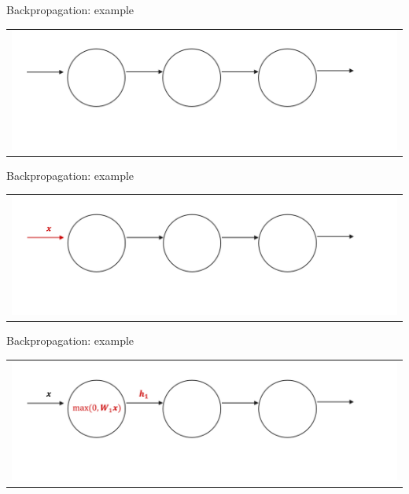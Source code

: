 \documentclass[aspectratio=169]{beamer}
\begin{document}

\begin{frame}{Backpropagation: example}
\begin{tabular}{c}
\includegraphics[width=1.\textwidth]{img/dnn/backprop/backprop_0.png}
\end{tabular}	
\end{frame}


\begin{frame}{Backpropagation: example}
\begin{tabular}{c}
\includegraphics[width=1.\textwidth]{img/dnn/backprop/backprop_1.png}
\end{tabular}	
\end{frame}


\begin{frame}{Backpropagation: example}
\begin{tabular}{c}
\includegraphics[width=1.\textwidth]{img/dnn/backprop/backprop_2.png}
\end{tabular}	
\end{frame}
\end{document}
